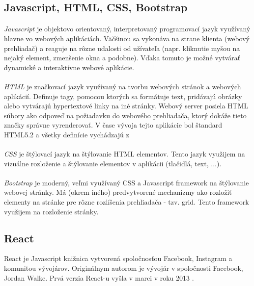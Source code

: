 \subsection{Javascript, HTML, CSS, Bootstrap}
\paragraph{}
\emph{Javascript} je objektovo orientovaný, interpretovaný programovací jazyk využívaný hlavne vo webových aplikáciách. Väčšinou sa vykonáva na strane klienta (webový prehliadač) a reaguje na rôzne udalosti od užívateľa (napr. kliknutie myšou na nejaký element, zmenšenie okna a podobne). Vďaka tomuto je možné vytvárať dynamické a interaktívne webové aplikácie.

\paragraph{}
\emph{HTML} je značkovací jazyk využívaný na tvorbu webových stránok a webových aplikácií. Definuje tagy, pomocou ktorých sa formátuje text, pridávajú obrázky alebo vytvárajú hypertextové linky na iné stránky. Webový server posiela HTML súbory ako odpoveď na požiadavku do webového prehliadača, ktorý dokáže tieto značky správne vyrenderovať. V čase vývoja tejto aplikácie bol štandard HTML5.2 a všetky definície vychádzajú z \cite{html}

\paragraph{}
\emph{CSS} je štýlovací jazyk na štýlovanie HTML elementov. Tento jazyk využijem na vizuálne rozloženie a štýlovanie elementov v aplikácii (tlačidlá, text, ...).

\paragraph{}
\emph{Bootstrap} je moderný, veľmi využívaný CSS a Javascript framework na štýlovanie webovej stránky. Má (okrem iného) predvytvorené mechanizmy ako rozložiť elementy na stránke pre rôzne rozlíšenia prehliadača - tzv. grid. Tento framework využijem na rozloženie stránky. 



\subsection{React}
React je Javascript knižnica vytvorená spoločnosťou Facebook, Instagram a komunitou vývojárov. Originálnym autorom je vývojár v spoločnosti Facebook, Jordan Walke. Prvá verzia React-u vyšla v marci v roku 2013 \cite{wiki:react}. 

